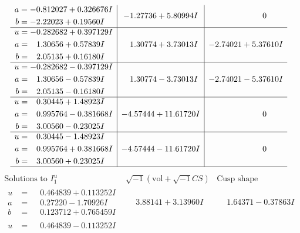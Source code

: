 \documentclass[1p]{elsarticle_modified}
\theoremstyle{definition}
\newcommand{\I}{\sqrt{-1}}
\begin{document}
$$\begin{array}{c|c|c}
\begin{aligned}
a &= -0.812027 + 0.326676 I \\
b &= -2.22023 + 0.19560 I\end{aligned}
 & -1.27736 + 5.80994 I & \phantom{-0.000000 } 0 \\ \hline\begin{aligned}
u &= -0.282682 + 0.397129 I \\
a &= \phantom{-}1.30656 + 0.57839 I \\
b &= \phantom{-}2.05135 + 0.16180 I\end{aligned}
 & \phantom{-}1.30774 + 3.73013 I & -2.74021 + 5.37610 I \\ \hline\begin{aligned}
u &= -0.282682 - 0.397129 I \\
a &= \phantom{-}1.30656 - 0.57839 I \\
b &= \phantom{-}2.05135 - 0.16180 I\end{aligned}
 & \phantom{-}1.30774 - 3.73013 I & -2.74021 - 5.37610 I \\ \hline\begin{aligned}
u &= \phantom{-}0.30445 + 1.48923 I \\
a &= \phantom{-}0.995764 - 0.381668 I \\
b &= \phantom{-}3.00560 - 0.23025 I\end{aligned}
 & -4.57444 + 11.61720 I & \phantom{-0.000000 } 0 \\ \hline\begin{aligned}
u &= \phantom{-}0.30445 - 1.48923 I \\
a &= \phantom{-}0.995764 + 0.381668 I \\
b &= \phantom{-}3.00560 + 0.23025 I\end{aligned}
 & -4.57444 - 11.61720 I & \phantom{-0.000000 } 0\\
 \hline 
 \end{array}$$\newpage$$\begin{array}{c|c|c}  
\text{Solutions to }I^u_{1}& \I (\text{vol} + \sqrt{-1}CS) & \text{Cusp shape}\\
 \hline 
\begin{aligned}
u &= \phantom{-}0.464839 + 0.113252 I \\
a &= \phantom{-}0.27220 - 1.70926 I \\
b &= \phantom{-}0.123712 + 0.765459 I\end{aligned}
 & \phantom{-}3.88141 + 3.13960 I & \phantom{-}1.64371 - 0.37863 I \\ \hline\begin{aligned}
u &= \phantom{-}0.464839 - 0.113252 I \\

\end{aligned}
\end{array}$$
\end{document}
